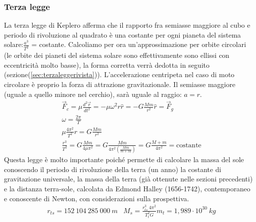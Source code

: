\subsubsection{Terza legge}\label{sec:terzalegge}
La terza legge di Keplero afferma che il rapporto fra semiasse maggiore al cubo e periodo di rivoluzione al quadrato è una costante per ogni pianeta del sistema solare:$\frac{a^3}{T^2}$ = costante. Calcoliamo per ora un'approssimazione per orbite circolari (le orbite dei pianeti del sistema solare sono effettivamente sono ellissi con eccentricità molto basse), la forma corretta verrà dedotta in seguito (sezione(\ref{sec:terzaleggerivista})). L'accelerazione centripeta nel caso di moto circolare è proprio la forza di attrazione gravitazionale. Il semiasse maggiore (uguale a quello minore nel cerchio), sarà uguale al raggio: $a = r$.
\begin{align*}
	&\vec{F}_c = \mu\frac{d^2\vec{r}}{dt^2}= -\mu\omega^2 r \hat{r} = -G\frac{Mm}{r^2} \hat{r}=\vec{F}_g\\
	&\omega =\frac{2\pi}{T}\\
	&\mu\frac{4\pi^2}{T^2} r  = G\frac{Mm}{r^2}\\
	&\frac{r^3}{T^2} = G\frac{Mm}{4 \mu \pi^2}= G\frac{Mm}{4 \pi^2 (\frac{Mm}{m+M})}= G\frac{M+m}{4 \pi^2} = \text{costante}
\end{align*} 
Questa legge è molto importante poiché permette di calcolare la massa del sole conoscendo il periodo di rivoluzione della terra (un anno) la costante di gravitazione universale, la massa della terra (già ottenute nelle sezioni precedenti) e la distanza terra-sole, calcolata da Edmond Halley (1656-1742), contemporaneo e conoscente di Newton, con considerazioni sulla prospettiva.
\begin{align*}
	&r_{ts} = 152\ 104\ 285\ 000\ m
	&M_s = \frac{r_{ts}^3\ 4 \pi^2}{T_t^2 G}m_t= 1,989 \cdot 10 ^{30} \ kg
\end{align*}
